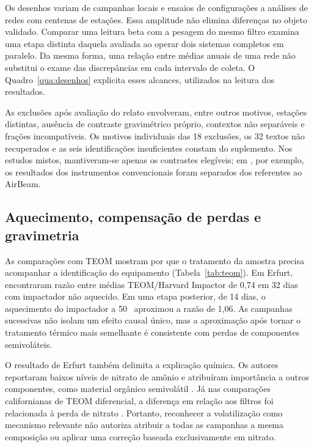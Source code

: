 Os desenhos variam de campanhas locais e ensaios de configurações a análises de redes com centenas de estações. Essa amplitude não elimina diferenças no objeto validado. Comparar uma leitura beta com a pesagem do mesmo filtro examina uma etapa distinta daquela avaliada ao operar dois sistemas completos em paralelo. Da mesma forma, uma relação entre médias anuais de uma rede não substitui o exame das discrepâncias em cada intervalo de coleta. O Quadro~\ref{qua:desenhos} explicita esses alcances, utilizados na leitura dos resultados.

As exclusões após avaliação do relato envolveram, entre outros motivos, estações distintas, ausência de contraste gravimétrico próprio, contextos não separáveis e frações incompatíveis. Os motivos individuais das 18 exclusões, os 32 textos não recuperados e as seis identificações insuficientes constam do suplemento. Nos estudos mistos, mantiveram-se apenas os contrastes elegíveis; em \textcite{rsl376}, por exemplo, os resultados dos instrumentos convencionais foram separados dos referentes ao AirBeam.

\subsection{Aquecimento, compensação de perdas e gravimetria}

As comparações com TEOM mostram por que o tratamento da amostra precisa acompanhar a identificação do equipamento (Tabela~\ref{tab:teom}). Em Erfurt, \textcite{rsl201} encontraram razão entre médias TEOM/Harvard Impactor de 0,74 em 32 dias com impactador não aquecido. Em uma etapa posterior, de 14 dias, o aquecimento do impactador a 50~\textcelsius{} aproximou a razão de 1,06. As campanhas sucessivas não isolam um efeito causal único, mas a aproximação após tornar o tratamento térmico mais semelhante é consistente com perdas de componentes semivoláteis.



O resultado de Erfurt também delimita a explicação química. Os autores reportaram baixos níveis de nitrato de amônio e atribuíram importância a outros componentes, como material orgânico semivolátil \parencite{rsl201}. Já nas comparações californianas de TEOM diferencial, a diferença em relação aos filtros foi relacionada à perda de nitrato \parencite{rsl101,rsl202}. Portanto, reconhecer a volatilização como mecanismo relevante não autoriza atribuir a todas as campanhas a mesma composição ou aplicar uma correção baseada exclusivamente em nitrato.

